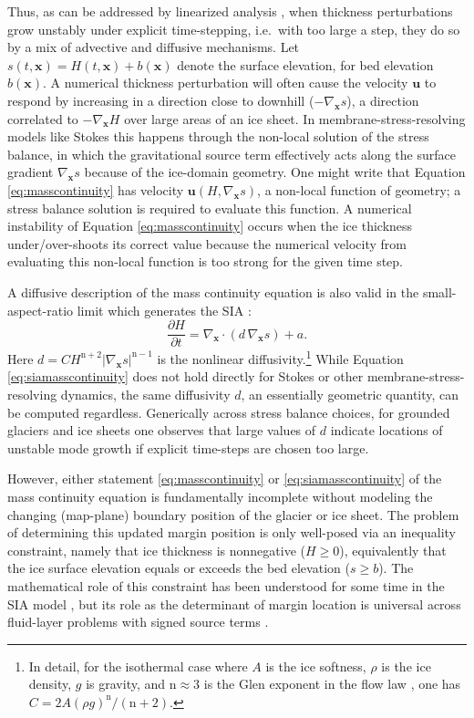 \documentclass[review,letterpaper]{igs}
\newcommand\bu{\mathbf{u}}
\newcommand\bx{\mathbf{x}}
\newcommand{\Divx}{\nabla_\bx \cdot}
\newcommand{\gradx}{\nabla_\bx}
\begin{document}
Thus, as can be addressed by linearized analysis \citep{Robinsonetal2022}, when thickness perturbations grow unstably under explicit time-stepping, i.e.~with too large a step, they do so by a mix of  advective and diffusive mechanisms.  Let $s(t,\bx)=H(t,\bx)+b(\bx)$ denote the surface elevation, for bed elevation $b(\bx)$.  A numerical thickness perturbation will often cause the velocity $\bu$ to respond by increasing in a direction close to downhill ($-\gradx s$), a direction correlated to $-\gradx H$ over large areas of an ice sheet.  In membrane-stress-resolving models like Stokes this happens through the non-local solution of the stress balance, in which the gravitational source term effectively acts along the surface gradient $\gradx s$ because of the ice-domain geometry.  One might write that Equation \eqref{eq:masscontinuity} has velocity $\bu(H,\gradx s)$, a non-local function of geometry; a stress balance solution is required to evaluate this function.  A numerical instability of Equation \eqref{eq:masscontinuity} occurs when the ice thickness under/over-shoots its correct value because the numerical velocity from evaluating this non-local function is too strong for the given time step.

\newcommand{\nn}{\text{n}}
A diffusive description of the mass continuity equation is also valid in the small-aspect-ratio limit which generates the SIA \citep{SchoofHewitt2013}:
\begin{equation}
\frac{\partial H}{\partial t} = \Divx \left(d\, \gradx s \right) + a. \label{eq:siamasscontinuity}
\end{equation}
Here $d = C H^{\nn+2} |\gradx s|^{\nn-1}$ is the nonlinear diffusivity.\footnote{In detail, for the isothermal case where $A$ is the ice softness, $\rho$ is the ice density, $g$ is gravity, and $\nn\approx 3$ is the Glen exponent in the flow law \citep{GreveBlatter2009}, one has $C = 2 A (\rho g)^\nn/(\nn+2)$.}  While Equation \eqref{eq:siamasscontinuity} does not hold directly for Stokes or other membrane-stress-resolving dynamics, the same diffusivity $d$, an essentially geometric quantity, can be computed regardless.  Generically across stress balance choices, for grounded glaciers and ice sheets one observes that large values of $d$ indicate locations of unstable mode growth if explicit time-steps are chosen too large.

However, either statement \eqref{eq:masscontinuity} or \eqref{eq:siamasscontinuity} of the mass continuity equation is fundamentally incomplete without modeling the changing (map-plane) boundary position of the glacier or ice sheet.  The problem of determining this updated margin position is only well-posed via an inequality constraint, namely that ice thickness is nonnegative ($H\ge 0$), equivalently that the ice surface elevation equals or exceeds the bed elevation ($s \ge b$).  The mathematical role of this constraint has been understood for some time in the SIA model \citep{Calvoetal2002,JouvetBueler2012,SchoofHewitt2013}, but its role as the determinant of margin location is universal across fluid-layer problems with signed source terms \citep{Bueler2021conservation}.
\end{document}
